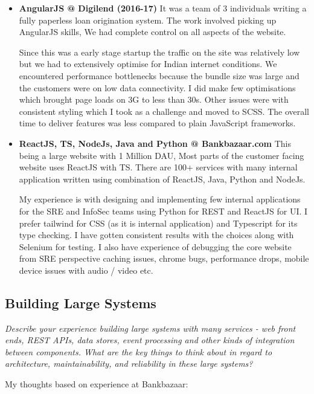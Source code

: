 \documentclass{article}
\begin{document}
\begin{itemize}
    \item \textbf{AngularJS @ Digilend (2016-17)} It was a team of 3 individuals writing a fully paperless loan origination system. 
    The work involved picking up AngularJS skills, We had complete control on all aspects of the website.

    Since this was a early stage startup the traffic on the site was relatively low but we had to extensively optimise for 
    Indian internet conditions. We encountered performance bottlenecks because the bundle size was large and the customers were on low data connectivity. 
    I did make few optimisations which brought page loads on 3G to less than 30s. Other issues were with consistent styling 
    which I took as a challenge and moved to SCSS. The overall time to deliver features was less compared to plain JavaScript frameworks.
    

    \item \textbf{ReactJS, TS, NodeJs, Java and Python @ Bankbazaar.com} This being a large website with 1 Million DAU, Most parts of the customer facing website uses ReactJS with TS. 
    There are 100+ services with many internal application written using combination of ReactJS, Java, Python and NodeJs. 

    My experience is with designing and implementing few internal applications for the SRE and InfoSec teams using Python for REST and ReactJS for UI. I prefer
    tailwind for CSS (as it is internal application) and Typescript for its type checking. I have gotten consistent results with
    the choices along with Selenium for testing. I also have experience of debugging the core website from SRE perspective 
    caching issues, chrome bugs, performance drops, mobile device issues with audio / video etc.

    
\end{itemize}


\subsection{Building Large Systems}
\small \textit{Describe your experience building large systems with many services - web front ends, REST APIs, data stores, event processing and other kinds of integration between components. What are the key things to think about in regard to architecture, maintainability, and reliability in these large systems?} 
\normalsize 

My thoughts based on experience at Bankbazaar:
\end{document}

